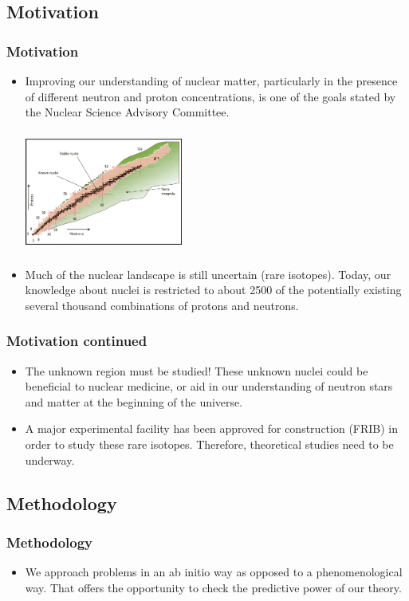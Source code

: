 \documentclass[10pt,serif]{beamer}
\begin{document}
\subsection{Motivation}
\begin{frame}
\frametitle{Motivation}
\begin{itemize}
\item Improving our understanding of nuclear matter, particularly in the presence of different
neutron and proton concentrations, is one of the goals stated by the Nuclear Science Advisory Committee.
\begin{center}
\includegraphics[width=5.2cm,height=4cm]{nuclearlandscape.jpg}
\end{center}
\item Much of the nuclear landscape is still uncertain (rare isotopes). Today, our knowledge about nuclei is restricted to about 2500 of the potentially existing several thousand combinations of protons and neutrons.
\end{itemize}
\end{frame}
\begin{frame}
\frametitle{Motivation continued}
\begin{itemize}
\item \alert{ The unknown region must be studied}! These unknown nuclei could be beneficial to nuclear medicine, or aid in our understanding of neutron stars and matter at the beginning of the universe.
\item A major experimental facility has been approved for construction (FRIB) in order to study these rare isotopes. \alert{Therefore, theoretical studies need to be underway}.
\end{itemize}
\end{frame}
\subsection{Methodology}
\begin{frame}
\frametitle{Methodology}
\begin{itemize}
\item \alert{We approach problems in an ab initio way as opposed to a phenomenological way}. That offers the opportunity to check the predictive power of our theory.
\end{itemize}
\end{frame}
\end{document}
